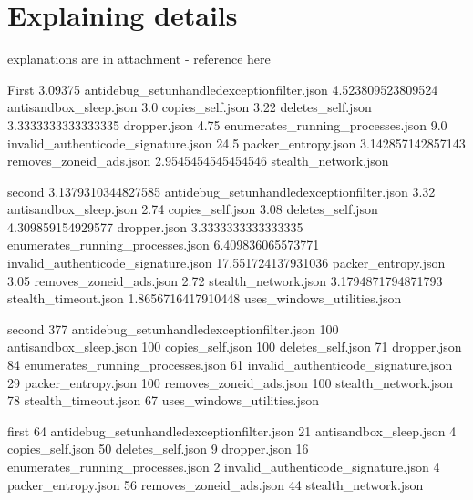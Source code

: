 \chapter{Explaining details} \label{app:expl}
explanations are in attachment - reference here

First
3.09375 antidebug_setunhandledexceptionfilter.json
4.523809523809524 antisandbox_sleep.json
3.0 copies_self.json
3.22 deletes_self.json
3.3333333333333335 dropper.json
4.75 enumerates_running_processes.json
9.0 invalid_authenticode_signature.json
24.5 packer_entropy.json
3.142857142857143 removes_zoneid_ads.json
2.9545454545454546 stealth_network.json

second
3.1379310344827585 antidebug_setunhandledexceptionfilter.json
3.32 antisandbox_sleep.json
2.74 copies_self.json
3.08 deletes_self.json
4.309859154929577 dropper.json
3.3333333333333335 enumerates_running_processes.json
6.409836065573771 invalid_authenticode_signature.json
17.551724137931036 packer_entropy.json
3.05 removes_zoneid_ads.json
2.72 stealth_network.json
3.1794871794871793 stealth_timeout.json
1.8656716417910448 uses_windows_utilities.json

second
377 antidebug_setunhandledexceptionfilter.json
100 antisandbox_sleep.json
100 copies_self.json
100 deletes_self.json
71 dropper.json
84 enumerates_running_processes.json
61 invalid_authenticode_signature.json
29 packer_entropy.json
100 removes_zoneid_ads.json
100 stealth_network.json
78 stealth_timeout.json
67 uses_windows_utilities.json

first
64 antidebug_setunhandledexceptionfilter.json
21 antisandbox_sleep.json
4 copies_self.json
50 deletes_self.json
9 dropper.json
16 enumerates_running_processes.json
2 invalid_authenticode_signature.json
4 packer_entropy.json
56 removes_zoneid_ads.json
44 stealth_network.json